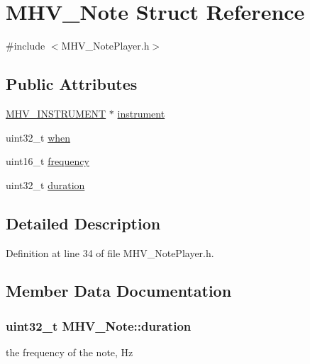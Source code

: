 \hypertarget{struct_m_h_v___note}{\section{M\-H\-V\-\_\-\-Note Struct Reference}
\label{struct_m_h_v___note}
}


{\ttfamily \#include $<$M\-H\-V\-\_\-\-Note\-Player.\-h$>$}

\subsection*{Public Attributes}
\begin{DoxyCompactItemize}
\item 
\hyperlink{_m_h_v___wave_generator_8h_ad8420c0a6c4bf917359c2c4f2e7720d3}{M\-H\-V\-\_\-\-I\-N\-S\-T\-R\-U\-M\-E\-N\-T} $\ast$ \hyperlink{struct_m_h_v___note_ae799998aafadeb322df99805a9c0d1bf}{instrument}
\item 
uint32\-\_\-t \hyperlink{struct_m_h_v___note_a561bc0a1d803744be9908e23fed4a017}{when}
\item 
uint16\-\_\-t \hyperlink{struct_m_h_v___note_a24c7addceca4036405ee15ecb0a01c71}{frequency}
\item 
uint32\-\_\-t \hyperlink{struct_m_h_v___note_ad15f9085f0a69ffcf1c66a2f00bbf222}{duration}
\end{DoxyCompactItemize}


\subsection{Detailed Description}


Definition at line 34 of file M\-H\-V\-\_\-\-Note\-Player.\-h.



\subsection{Member Data Documentation}
\hypertarget{struct_m_h_v___note_ad15f9085f0a69ffcf1c66a2f00bbf222}{
\subsubsection[{duration}]{\setlength{\rightskip}{0pt plus 5cm}uint32\-\_\-t M\-H\-V\-\_\-\-Note\-::duration}}\label{struct_m_h_v___note_ad15f9085f0a69ffcf1c66a2f00bbf222}
the frequency of the note, Hz 

